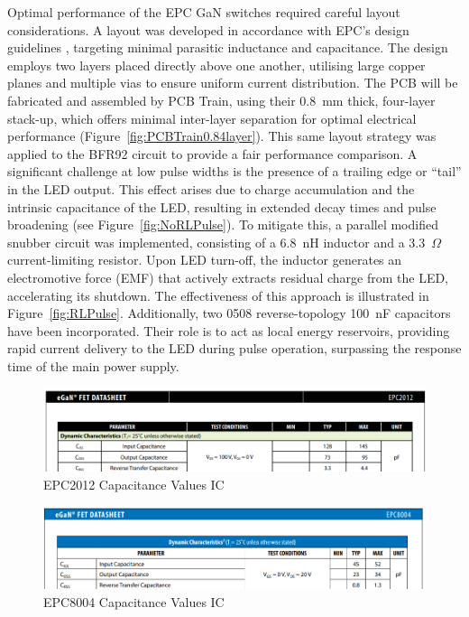 \documentclass[a4paper,11pt]{article}
\begin{document}
Optimal performance of the EPC GaN switches required careful layout considerations. A layout was developed in accordance with EPC's design guidelines \cite{EPCHSGuide}, targeting minimal parasitic inductance and capacitance. The design employs two layers placed directly above one another, utilising large copper planes and multiple vias to ensure uniform current distribution. The PCB will be fabricated and assembled by PCB Train, using their 0.8~mm thick, four-layer stack-up, which offers minimal inter-layer separation for optimal electrical performance (Figure~\ref{fig:PCBTrain0.84layer}). This same layout strategy was applied to the BFR92 circuit to provide a fair performance comparison.
A significant challenge at low pulse widths is the presence of a trailing edge or “tail” in the LED output. This effect arises due to charge accumulation and the intrinsic capacitance of the LED, resulting in extended decay times and pulse broadening (see Figure~\ref{fig:NoRLPulse}). To mitigate this, a parallel modified snubber circuit was implemented, consisting of a 6.8~nH inductor and a 3.3~$\Omega$ current-limiting resistor. Upon LED turn-off, the inductor generates an electromotive force (EMF) that actively extracts residual charge from the LED, accelerating its shutdown. The effectiveness of this approach is illustrated in Figure~\ref{fig:RLPulse}.
Additionally, two 0508 reverse-topology 100~nF capacitors have been incorporated. Their role is to act as local energy reservoirs, providing rapid current delivery to the LED during pulse operation, surpassing the response time of the main power supply.

\begin{figure}[htbp]
\centering
\includegraphics[scale=0.8]{EPC2012Cap.png}
\caption{EPC2012 Capacitance Values IC\label{fig:EPC2012Cap}}
\end{figure}

\begin{figure}[htbp]
\centering
\includegraphics[scale=0.8]{EPC8004Cap.png}
\caption{EPC8004 Capacitance Values IC\label{fig:EPC8004Cap}}
\end{figure}
\end{document}
